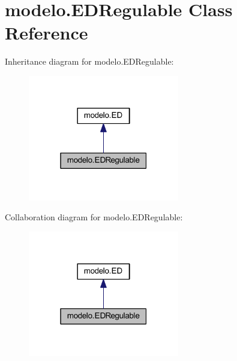 \hypertarget{classmodelo_1_1_e_d_regulable}{}\section{modelo.\+E\+D\+Regulable Class Reference}
\label{classmodelo_1_1_e_d_regulable}


Inheritance diagram for modelo.\+E\+D\+Regulable\+:
\nopagebreak
\begin{figure}[H]
\begin{center}
\leavevmode
\includegraphics[width=187pt]{classmodelo_1_1_e_d_regulable__inherit__graph}
\end{center}
\end{figure}


Collaboration diagram for modelo.\+E\+D\+Regulable\+:
\nopagebreak
\begin{figure}[H]
\begin{center}
\leavevmode
\includegraphics[width=187pt]{classmodelo_1_1_e_d_regulable__coll__graph}
\end{center}
\end{figure}
